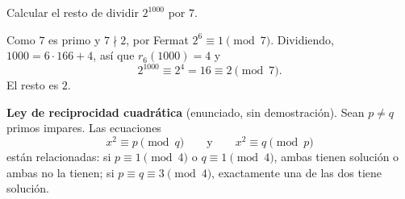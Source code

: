 \begin{ejemplo}
Calcular el resto de dividir $2^{1000}$ por $7$.

Como $7$ es primo y $7\nmid 2$, por Fermat $2^6\equiv 1 \pmod 7$. Dividiendo,
$1000=6\cdot 166+4$, así que $r_6(1000)=4$ y
\[
2^{1000}\equiv 2^4=16\equiv 2 \pmod 7.
\]
El resto es $2$.
\end{ejemplo}

\begin{nota}
\textbf{Ley de reciprocidad cuadrática} (enunciado, sin demostración). Sean $p\neq q$
primos impares. Las ecuaciones
\[
x^2\equiv p \pmod q \qquad\text{y}\qquad x^2\equiv q \pmod p
\]
están relacionadas: si $p\equiv 1 \pmod 4$ o $q\equiv 1 \pmod 4$, ambas tienen
solución o ambas no la tienen; si $p\equiv q\equiv 3 \pmod 4$, exactamente una de
las dos tiene solución.
\end{nota}